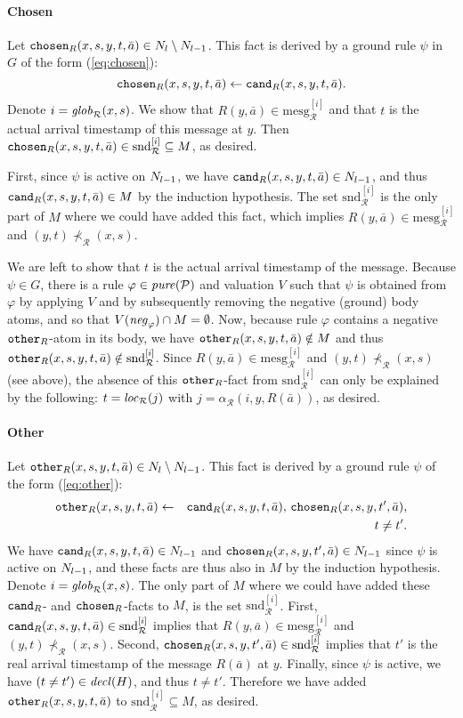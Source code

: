 \documentclass{tlp}
\newcommand{\ded}{\mathcal{P}}
\newcommand{\rl}{\varphi}
\newcommand{\bneg}[1]{\fname{neg}_{#1}}
\newcommand{\grl}{\psi}
\newcommand{\chosen}{\pred{chosen}}
\newcommand{\other}{\pred{other}}
\newcommand{\cand}{\pred{cand}}
\newcommand{\decl}[1]{\fname{decl}(#1)}
\newcommand{\pure}[1]{\fname{pure}(#1)}
\newcommand{\run}{\mathcal{R}}
\newcommand{\locR}[1]{\fname{loc}_{\run}(#1)}
\newcommand{\globR}[1]{\fname{glob}_{\run}(#1)}
\newcommand{\arr}{\alpha_{\run}}
\newcommand{\slicesnd}[1]{\text{snd}_{\run}^{[#1]}}
\newcommand{\mesg}[1]{\mathrm{mesg}_{\run}^{[#1]}}
\newcommand{\caus}{\prec_{\run}}
\newcommand{\grded}{G}
\begin{document}
\begin{appendix}
\paragraph*{Chosen}

Let $\chosen_{R}(x,s,y,t,\bar{a})\in\diffN$. This fact is derived
by a ground rule $\grl$ in $\grded$ of the form (\ref{eq:chosen}):
\[
\chosen_{R}(x,s,y,t,\bar{a})\gets\cand_{R}(x,s,y,t,\bar{a}).
\]
Denote $i=\globR{x,s}$. We show that $R(y,\bar{a})\in\mesg i$ and
that $t$ is the actual arrival timestamp of this message at $y$.
Then $\chosen_{R}(x,s,y,t,\bar{a})\in\slicesnd i\subseteq M$, as
desired.

First, since $\grl$ is active on $N_{l-1}$, we have $\cand_{R}(x,s,y,t,\bar{a})\in\prevN$,
and thus $\cand_{R}(x,s,y,t,\bar{a})\in M$ by the induction hypothesis.
The set $\slicesnd i$ is the only part of $M$ where we could have
added this fact, which implies $R(y,\bar{a})\in\mesg i$ and $(y,t)\not\caus(x,s)$.

We are left to show that $t$ is the actual arrival timestamp of the
message. Because $\grl\in\grded$, there is a rule $\rl\in\pure{\ded}$
and valuation $V$ such that $\grl$ is obtained from $\rl$ by applying
$V$ and by subsequently removing the negative (ground) body atoms,
and so that $V(\bneg{\rl})\cap M=\emptyset$. Now, because rule $\rl$
contains a negative $\other_{R}$-atom in its body, we have $\other_{R}(x,s,y,t,\bar{a})\notin M$
and thus $\other_{R}(x,s,y,t,\bar{a})\notin\slicesnd i$. Since $R(y,\bar{a})\in\mesg i$
and $(y,t)\not\caus(x,s)$ (see above), the absence of this $\other_{R}$-fact
from $\slicesnd i$ can only be explained by the following: $t=\locR j$
with $j=\arr(i,y,R(\bar{a}))$, as desired.




\paragraph*{Other}

Let $\other_{R}(x,s,y,t,\bar{a})\in\diffN$. This fact is derived
by a ground rule $\grl$ of the form (\ref{eq:other}):
\begin{eqnarray*}
\other_{R}(x,s,y,t,\bar{a}) & \gets & \cand_{R}(x,s,y,t,\bar{a}),\,\chosen_{R}(x,s,y,t',\bar{a}),\\
 &  & t\neq t'.
\end{eqnarray*}
We have $\cand_{R}(x,s,y,t,\bar{a})\in\prevN$ and $\chosen_{R}(x,s,y,t',\bar{a})\in\prevN$
since $\grl$ is active on $N_{l-1}$, and these facts are thus also
in $M$ by the induction hypothesis. Denote $i=\globR{x,s}$. The
only part of $M$ where we could have added these $\cand_{R}$- and
$\chosen_{R}$-facts to $M$, is the set $\slicesnd i$. First, $\cand_{R}(x,s,y,t,\bar{a})\in\slicesnd i$
implies that $R(y,\bar{a})\in\mesg i$ and $(y,t)\not\caus(x,s)$.
Second, $\chosen_{R}(x,s,y,t',\bar{a})\in\slicesnd i$ implies that
$t'$ is the real arrival timestamp of the message $R(\bar{a})$ at
$y$. Finally, since $\grl$ is active, we have $(t\neq t')\in\decl H$,
and thus $t\neq t'$. Therefore we have added $\other_{R}(x,s,y,t,\bar{a})$
to $\slicesnd i\subseteq M$, as desired.



\end{appendix}
\end{document}
